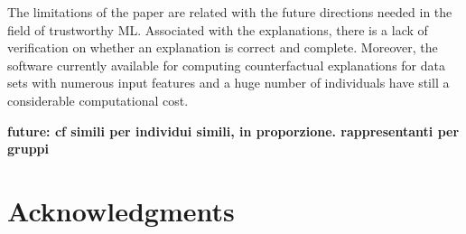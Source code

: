 \documentclass[letterpaper]{article} %
\begin{document}
The limitations of the paper are related with the future directions needed in the field of trustworthy ML. Associated with the explanations, there is a lack of verification on whether an explanation is correct and complete. 
Moreover, the software currently available for computing counterfactual explanations for data sets with numerous input features and a huge number of individuals have still a considerable computational cost.

\textbf{future: cf simili per individui simili, in proporzione. rappresentanti per gruppi}

\section{Acknowledgments}

%

\end{document}
